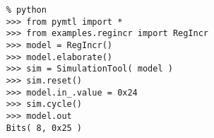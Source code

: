 

  \begin{lstlisting}[gobble=4]
    % cd ${TUTROOT}
    % python
    >>> from pymtl import *
    >>> from examples.regincr import RegIncr
    >>> model = RegIncr()
    >>> model.elaborate()
    >>> sim = SimulationTool( model )
    >>> sim.reset()
    >>> model.in_.value = 0x24
    >>> sim.cycle()
    >>> model.out
    Bits( 8, 0x25 )
\end{lstlisting}

  \captionsetup{justification=centering}
  \label{code-tut3-regincr-import1}

